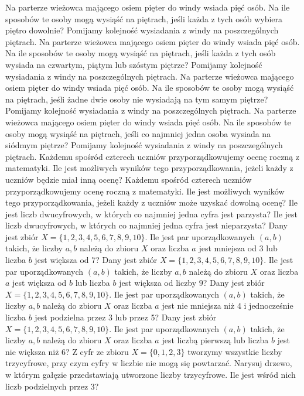 Na parterze wieżowca mającego osiem pięter do windy wsiada pięć osób. Na ile sposobów te osoby mogą wysiąść na piętrach, jeśli każda z tych osób wybiera piętro dowolnie? Pomijamy kolejność wysiadania z windy na poszczególnych piętrach.
Na parterze wieżowca mającego osiem pięter do windy wsiada pięć osób. Na ile sposobów te osoby mogą wysiąść na piętrach, jeśli każda z tych osób wysiada na czwartym, piątym lub szóstym piętrze? Pomijamy kolejność wysiadania z windy na poszczególnych piętrach.
Na parterze wieżowca mającego osiem pięter do windy wsiada pięć osób. Na ile sposobów te osoby mogą wysiąść na piętrach, jeśli żadne dwie osoby nie wysiadają na tym samym piętrze? Pomijamy kolejność wysiadania z windy na poszczególnych piętrach.
Na parterze wieżowca mającego osiem pięter do windy wsiada pięć osób. Na ile sposobów te osoby mogą wysiąść na piętrach, jeśli co najmniej jedna osoba wysiada na siódmym piętrze? Pomijamy kolejność wysiadania z windy na poszczególnych piętrach.
Każdemu spośród czterech uczniów przyporządkowujemy ocenę roczną z matematyki. Ile jest możliwych wyników tego przyporządkowania, jeżeli każdy z uczniów będzie miał inną ocenę?
Każdemu spośród czterech uczniów przyporządkowujemy ocenę roczną z matematyki. Ile jest możliwych wyników tego przyporządkowania, jeżeli każdy z uczniów może uzyskać dowolną ocenę?
Ile jest liczb dwucyfrowych, w których co najmniej jedna cyfra jest parzysta?
Ile jest liczb dwucyfrowych, w których co najmniej jedna cyfra jest nieparzysta?
Dany jest zbiór $X = \{1, 2, 3, 4, 5, 6, 7, 8, 9, 10\}$. Ile jest par uporządkowanych $(a, b)$ takich, że liczby $a, b$ należą do zbioru $X$ oraz liczba $a$ jest mniejsza od 3 lub liczba $b$ jest większa od 7?
Dany jest zbiór $X = \{1, 2, 3, 4, 5, 6, 7, 8, 9, 10\}$. Ile jest par uporządkowanych $(a, b)$ takich, że liczby $a, b$ należą do zbioru $X$ oraz liczba $a$ jest większa od $b$ lub liczba $b$ jest większa od liczby $9$?
Dany jest zbiór $X = \{1, 2, 3, 4, 5, 6, 7, 8, 9, 10\}$. Ile jest par uporządkowanych $(a, b)$ takich, że liczby $a, b$ należą do zbioru $X$ oraz liczba $a$ jest nie mniejsza niż 4 i jednocześnie liczba $b$ jest podzielna przez 3 lub przez 5?
Dany jest zbiór $X = \{1, 2, 3, 4, 5, 6, 7, 8, 9, 10\}$. Ile jest par uporządkowanych $(a, b)$ takich, że liczby $a, b$ należą do zbioru $X$ oraz liczba $a$ jest liczbą pierwszą lub liczba $b$ jest nie większa niż 6?
Z cyfr ze zbioru $X = \{0, 1, 2, 3\}$ tworzymy wszystkie liczby trzycyfrowe, przy czym cyfry w liczbie nie mogą się powtarzać. Narysuj drzewo, w którym gałęzie przedstawiają utworzone liczby trzycyfrowe. Ile jest wśród nich liczb podzielnych przez 3?
